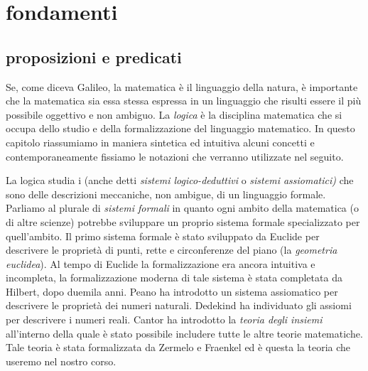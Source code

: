\chapter{fondamenti}
\section{proposizioni e predicati}

Se, come diceva Galileo, la matematica è il linguaggio della natura,
è importante che la matematica sia essa stessa espressa in un linguaggio
che risulti essere il più possibile oggettivo e non ambiguo.
La \emph{logica} è la disciplina matematica che si occupa
dello studio e della formalizzazione del linguaggio matematico.
In questo capitolo riassumiamo in maniera sintetica ed intuitiva
alcuni concetti e contemporaneamente
fissiamo le notazioni che verranno utilizzate nel seguito.

La logica studia i  (anche detti \emph{sistemi logico-deduttivi}
o \emph{sistemi assiomatici)} che sono delle descrizioni meccaniche, non ambigue, 
di un linguaggio formale. 
Parliamo al plurale di \emph{sistemi formali} in quanto ogni ambito della matematica 
(o di altre scienze) potrebbe sviluppare un proprio sistema formale specializzato per quell'ambito. 
Il primo sistema formale è stato sviluppato da Euclide per descrivere le proprietà 
di punti, rette e circonferenze del piano (la \emph{geometria euclidea}).
Al tempo di Euclide la formalizzazione era ancora intuitiva e incompleta, 
la formalizzazione moderna 
di tale sistema è stata completata da Hilbert, dopo duemila anni.
Peano ha introdotto un sistema assiomatico per descrivere le proprietà dei numeri naturali.
Dedekind ha individuato gli assiomi per descrivere i numeri reali.
Cantor ha introdotto la \emph{teoria degli insiemi} all'interno della quale è stato 
possibile includere tutte le altre teorie matematiche. 
Tale teoria è stata formalizzata da Zermelo e Fraenkel
ed è questa la teoria che useremo nel nostro corso.

